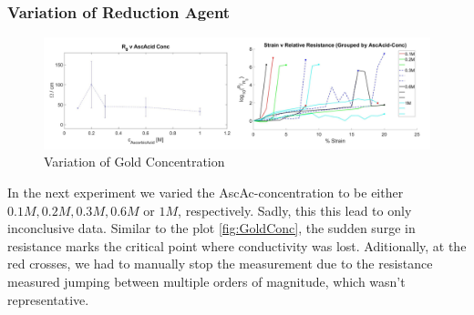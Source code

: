 \subsubsection{Variation of Reduction Agent}


\begin{figure}[H]
    \centerline{\includegraphics[scale=0.5]{./pic/StrainVAscAcidConc_2.PNG}}
    \caption{Variation of Gold Concentration}
    \label{fig:StrainVAscAcidConc}
\end{figure}

In the next experiment we varied the AscAc-concentration to be either $0.1M, 0.2M, 0.3M, 0.6M$  or $1M$, respectively. Sadly, this this lead to only inconclusive data. Similar to the plot \ref{fig:GoldConc}, the sudden surge in resistance marks the critical point where conductivity was lost. Aditionally, at the red crosses, we had to manually stop the measurement due to the resistance measured jumping between multiple orders of magnitude, which wasn't representative. 